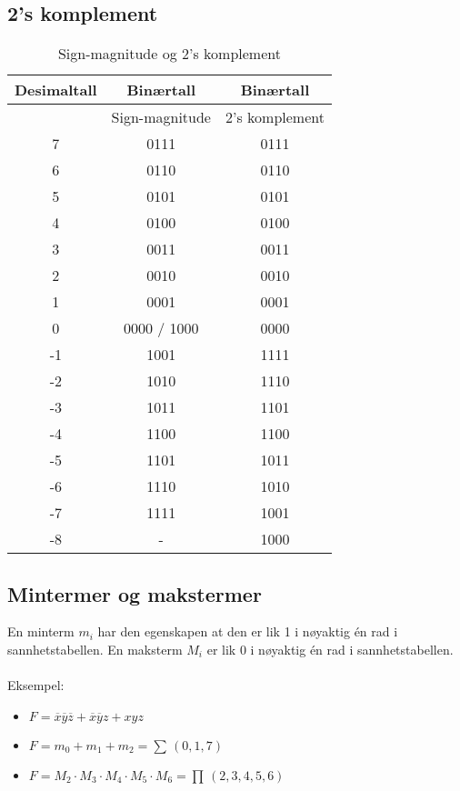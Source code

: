 \documentclass{article}
\begin{document}
\subsection{2's komplement}
\begin{table}[h]
    \centering
    \begin{tabular}{c|c|c}
    Desimaltall & Binærtall & Binærtall \\
    \hline
     & Sign-magnitude & 2's komplement \\
    \hline
    7   & 0111          & 0111\\
    6   & 0110          & 0110\\
    5   & 0101          & 0101\\
    4   & 0100          & 0100\\
    3   & 0011          & 0011\\
    2   & 0010          & 0010\\
    1   & 0001          & 0001\\
    0   & 0000 / 1000   & 0000\\
    -1  & 1001          & 1111\\
    -2  & 1010          & 1110\\
    -3  & 1011          & 1101\\
    -4  & 1100          & 1100\\
    -5  & 1101          & 1011\\
    -6  & 1110          & 1010\\
    -7  & 1111          & 1001\\
    -8  & -             & 1000
    \end{tabular}
    \caption{Sign-magnitude og 2's komplement}
\end{table}


\subsection{Mintermer og makstermer}
En minterm $m_i$ har den egenskapen at den er lik 1 i nøyaktig én rad i sannhetstabellen. En maksterm $M_i$ er lik 0 i nøyaktig én rad i sannhetstabellen.\\\\
Eksempel:
\begin{itemize}
    \item $F = \overline{x}\overline{y}\overline{z} + \overline{x}\overline{y}z + xyz$
    \item $F = m_0 + m_1 + m_2 = \sum \, (0, 1, 7)$
    \item $F = M_2 \cdot M_3 \cdot M_4 \cdot M_5 \cdot M_6 = \prod \, (2, 3, 4, 5, 6)$
\end{itemize}
\end{document}

